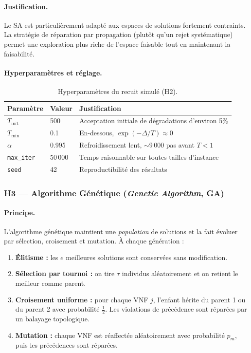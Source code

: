 \documentclass{article}
\begin{document}
\paragraph{Justification.}
Le SA est particulièrement adapté aux espaces de solutions fortement contraints.
La stratégie de réparation par propagation (plutôt qu'un rejet systématique) permet
une exploration plus riche de l'espace faisable tout en maintenant la faisabilité.

\paragraph{Hyperparamètres et réglage.}

\begin{table}[h!]
\centering
\begin{tabular}{lll}
\toprule
\textbf{Paramètre} & \textbf{Valeur} & \textbf{Justification} \\
\midrule
$T_{\text{init}}$   & 500     & Acceptation initiale de dégradations d'environ 5\% \\
$T_{\text{min}}$    & 0.1     & En-dessous, $\exp(-\Delta/T) \approx 0$ \\
$\alpha$            & 0.995   & Refroidissement lent, $\sim$9\,000 pas avant $T < 1$ \\
\texttt{max\_iter}  & 50\,000 & Temps raisonnable sur toutes tailles d'instance \\
\texttt{seed}       & 42      & Reproductibilité des résultats \\
\bottomrule
\end{tabular}
\caption{Hyperparamètres du recuit simulé (H2).}
\end{table}

\subsubsection{H3 --- Algorithme Génétique (\textit{Genetic Algorithm}, GA)}

\paragraph{Principe.}
L'algorithme génétique maintient une \emph{population} de solutions et la fait
évoluer par sélection, croisement et mutation. À chaque génération :
\begin{enumerate}
  \item \textbf{Élitisme :} les $e$ meilleures solutions sont conservées sans
    modification.
  \item \textbf{Sélection par tournoi :} on tire $\tau$ individus aléatoirement
    et on retient le meilleur comme parent.
  \item \textbf{Croisement uniforme :} pour chaque VNF $j$, l'enfant hérite du
    parent 1 ou du parent 2 avec probabilité $\frac{1}{2}$. Les violations de
    précédence sont réparées par un balayage topologique.
  \item \textbf{Mutation :} chaque VNF est réaffectée aléatoirement avec
    probabilité $p_m$, puis les précédences sont réparées.
\end{enumerate}
\end{document}
